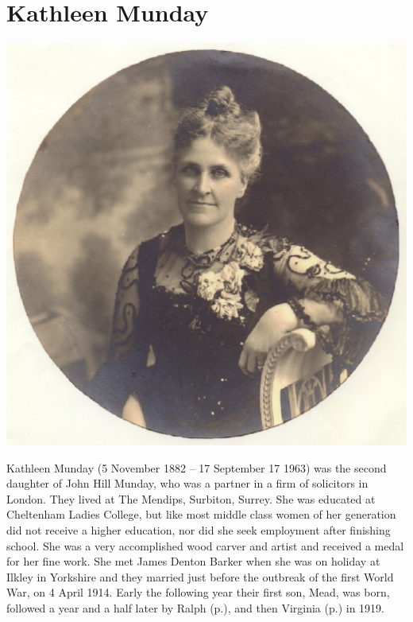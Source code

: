 \section{Kathleen Munday}\label{Kathleen_Munday}

\begin{center}
\includegraphics[width=0.8\linewidth]{Kathleen_Munday/portrait}
\end{center}

Kathleen Munday (5 November 1882 -- 17 September 17 1963) was the second daughter of John Hill Munday, who was a partner in a firm of solicitors in London. They lived at The Mendips, Surbiton, Surrey. She was educated at Cheltenham Ladies College, but like most middle class women of her generation did not receive a higher education, nor did she seek employment after finishing school. She was a very accomplished wood carver and artist and received a medal for her fine work. She met James Denton Barker when she was on holiday at Ilkley in Yorkshire and they married just before the outbreak of the first World War, on 4 April 1914. Early the following year their first son, Mead, was born, followed a year and a half later by Ralph (p.\pageref{Ralph_Munday_Denton-Barker}), and then Virginia (p.\pageref{Virginia_Kathleen_Denton_Barker}) in 1919.
